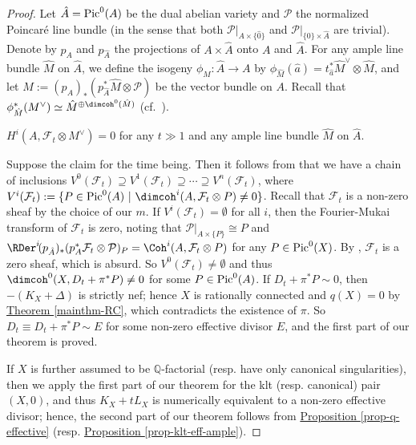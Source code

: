\begin{proof}
Let $\hat{A}=\textup{Pic}^0(A)$ be the dual abelian variety and $\mathcal{P}$  the normalized Poincar\'e line bundle (in the sense that both $\mathcal{P}|_{A\times\{\hat{0}\}}$ and $\mathcal{P}|_{\{0\}\times\hat{A}}$ are trivial).
Denote by $p_A$ and $p_{\hat{A}}$ the projections of $A\times\hat{A}$ onto $A$ and $\hat{A}$.
For any ample line bundle $\hat{M}$ on $\hat{A}$, we define the isogeny $\phi_{\hat{M}}:\hat{A}\to A$  by $\phi_{\hat{M}}(\hat{a})=t_{\hat{a}}^*\hat{M}^{\vee}\otimes\hat{M}$, and
let $M:=(p_{A})_*(p_{\hat{A}}^*\hat{M}\otimes\mathcal{P})$ be the vector bundle on $A$.
Recall that $\phi_{\hat{M}}^*(M^{\vee})\simeq\hat{M}^{\oplus\dimcoh^0(\hat{M})}$ (cf.~\cite[Proposition 3.11 (1)]{Muk81}). 
\begin{claim}\label{claim_fm}
$H^i(A,\mathcal{F}_t\otimes M^{\vee})=0$ for any  $t\gg1$ and any ample line bundle $\hat{M}$ on $\hat{A}$. 
\end{claim}
Suppose the claim for the time being.
Then it follows from \cite[Theorem 1.2 and Corollary 3.2]{Hac04} that
we have a chain of inclusions
$V^0(\mathcal{F}_t)\supseteq V^1(\mathcal{F}_t)\supseteq\cdots\supseteq V^n(\mathcal{F}_t)$, 
where $V^i(\mathcal{F}_t):=\{P\in\textup{Pic}^0(A)~|~\dimcoh^i(A,\mathcal{F}_t\otimes P)\neq 0\}$.
Recall that $\mathcal{F}_t$ is a  non-zero sheaf by the choice of our $m$. 
If  $V^i(\mathcal{F}_t)=\emptyset$ for all $i$, then the Fourier-Mukai transform of $\mathcal{F}_t$ is zero, noting that $\mathcal{P}|_{A\times\{P\}}\cong P$ and 
$\RDer^i\!(p_{\hat{A}})_*(p_A^*\mathcal{F}_t\otimes\mathcal{P})_P=\Coh^i(A,\mathcal{F}_t\otimes P)$ 
for any $P\in\textup{Pic}^0(X)$.  
By \cite[Theorem 2.2]{Muk81},  $\mathcal{F}_t$ is a zero sheaf, which is absurd. 
So $V^0(\mathcal{F}_t)\neq\emptyset$ and thus
$\dimcoh^0(X,D_t+\pi^*P)\neq 0$ for some $P\in\textup{Pic}^0(A)$.
If $D_t+\pi^*P\sim 0$, then $-(K_X+\Delta)$ is strictly nef; hence $X$ is rationally connected and  $q(X)=0$ by {\hyperref[mainthm-RC]{Theorem \ref*{mainthm-RC}}},  which contradicts the existence of $\pi$. 
So  $D_t\equiv D_t+\pi^*P\sim E$ for some non-zero effective divisor $E$, 
and the first part of our theorem is proved.

If $X$ is further assumed to be  $\mathbb{Q}$-factorial (resp. have only canonical singularities), then we apply the first part of our theorem for the klt (resp. canonical) pair $(X,0)$, and thus $K_X+tL_X$ is numerically equivalent to a non-zero effective divisor; hence, the second part of our theorem 
 follows from {\hyperref[prop-q-effective]{Proposition  \ref*{prop-q-effective}}} (resp. {\hyperref[prop-klt-eff-ample]{Proposition  \ref*{prop-klt-eff-ample}}}). 
 

\end{proof}
